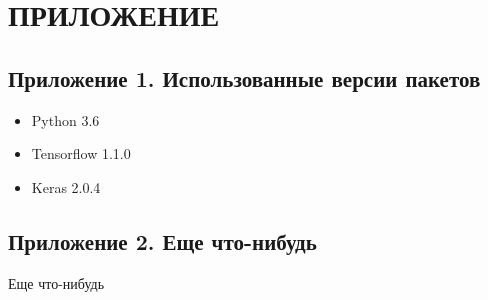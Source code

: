 \section*{\hfil ПРИЛОЖЕНИЕ \hfil}
	\subsection*{Приложение 1. Использованные версии пакетов}
		\begin{itemize}
			\item Python 3.6
			\item Tensorflow 1.1.0
			\item Keras 2.0.4
		\end{itemize}
	\subsection*{Приложение 2. Еще что-нибудь}
		Еще что-нибудь